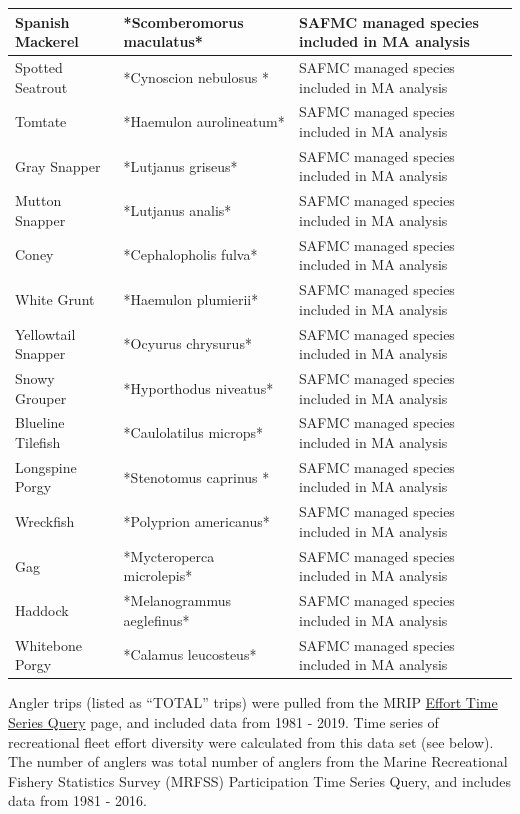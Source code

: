 \documentclass[
]{book}
\begin{document}
\begin{table}
\begin{tabular}[t]{l|l|l}
\hline
Spanish Mackerel & *Scomberomorus maculatus* & SAFMC managed species included in MA analysis\\
\hline
Spotted Seatrout & *Cynoscion nebulosus * & SAFMC managed species included in MA analysis\\
\hline
Tomtate & *Haemulon aurolineatum* & SAFMC managed species included in MA analysis\\
\hline
Gray Snapper & *Lutjanus griseus* & SAFMC managed species included in MA analysis\\
\hline
Mutton Snapper & *Lutjanus analis* & SAFMC managed species included in MA analysis\\
\hline
Coney & *Cephalopholis fulva* & SAFMC managed species included in MA analysis\\
\hline
White Grunt & *Haemulon plumierii* & SAFMC managed species included in MA analysis\\
\hline
Yellowtail Snapper & *Ocyurus chrysurus* & SAFMC managed species included in MA analysis\\
\hline
Snowy Grouper & *Hyporthodus niveatus* & SAFMC managed species included in MA analysis\\
\hline
Blueline Tilefish & *Caulolatilus microps* & SAFMC managed species included in MA analysis\\
\hline
Longspine Porgy & *Stenotomus caprinus * & SAFMC managed species included in MA analysis\\
\hline
Wreckfish & *Polyprion americanus* & SAFMC managed species included in MA analysis\\
\hline
Gag & *Mycteroperca microlepis* & SAFMC managed species included in MA analysis\\
\hline
Haddock & *Melanogrammus aeglefinus* & SAFMC managed species included in MA analysis\\
\hline
Whitebone Porgy & *Calamus leucosteus* & SAFMC managed species included in MA analysis\\
\hline
\end{tabular}
\end{table}

Angler trips (listed as ``TOTAL'' trips) were pulled from the MRIP \href{https://www.st.nmfs.noaa.gov/recreational-fisheries/data-and-documentation/run-a-data-query}{Effort Time Series Query} page, and included data from 1981 - 2019. Time series of recreational fleet effort diversity were calculated from this data set (see below). The number of anglers was total number of anglers from the Marine Recreational Fishery Statistics Survey (MRFSS) Participation Time Series Query, and includes data from 1981 - 2016.
\end{document}
